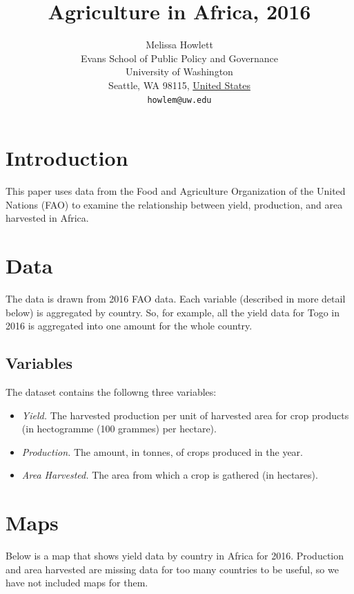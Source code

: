 \documentclass{article}
\title{Agriculture in Africa, 2016}
\author{
        Melissa Howlett\\
        Evans School of Public Policy and Governance\\
        University of Washington\\
        Seattle, WA 98115, \underline{United States}\\
        \texttt{howlem@uw.edu}
}
\begin{document}

\maketitle

\section{Introduction}\label{intro}
This paper uses data from the Food and Agriculture Organization of the United Nations (FAO) to examine the relationship between yield, production, and area harvested in Africa.

\section{Data}\label{datas}
The data is drawn from 2016 FAO data. Each variable (described in more detail below) is aggregated by country. So, for example, all the yield data for Togo in 2016 is aggregated into one amount for the whole country. 

\subsection{Variables}\label{eda}

The dataset contains the followng three variables:
\begin{itemize}
  \item \emph{Yield.} The harvested production per unit of harvested area for crop products (in hectogramme (100 grammes) per hectare). 
  \item \emph{Production.} The amount, in tonnes, of crops produced in the year. 
  \item \emph{Area Harvested.} The area from which a crop is gathered (in hectares). 
\end{itemize}


\section{Maps}\label{maps}
Below is a map that shows yield data by country in Africa for 2016. Production and area harvested are missing data for too many countries to be useful, so we have not included maps for them.  
\end{document}
